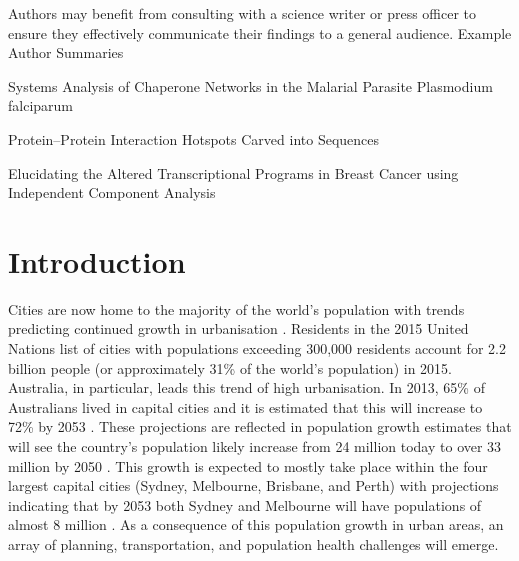 \documentclass[10pt,letterpaper]{article}
\begin{document}
Authors may benefit from consulting with a science writer or press officer to ensure they effectively communicate their findings to a general audience.
Example Author Summaries
 

Systems Analysis of Chaperone Networks in the Malarial Parasite Plasmodium falciparum

Protein–Protein Interaction Hotspots Carved into Sequences

Elucidating the Altered Transcriptional Programs in Breast Cancer using Independent Component Analysis

\linenumbers



\section*{Introduction}\label{sec:introduction}


Cities are now home to the majority of the world's population with trends predicting continued growth in urbanisation \cite{UNDESA2015,WHO2016}. Residents in the 2015 United Nations list of cities with populations exceeding 300,000 residents \cite{UN2014} account for 2.2 billion people (or approximately 31\% of the world's population) in 2015. Australia, in particular, leads this trend of high urbanisation. In 2013, 65\% of Australians lived in capital cities and it is estimated that this will increase to 72\% by 2053  \cite{ABS2008}. These projections are reflected in population growth estimates that will see the country's population likely increase from 24 million today to over 33 million by 2050 \cite{ABS2008}. This growth is expected to mostly take place within the four largest capital cities (Sydney, Melbourne, Brisbane, and Perth) with projections indicating that by 2053 both Sydney and Melbourne will have populations of almost 8 million  \cite{CommonwealthofAustralia2010}. As a consequence of this population growth in urban areas, an array of planning, transportation, and population health challenges will emerge.
\end{document}
